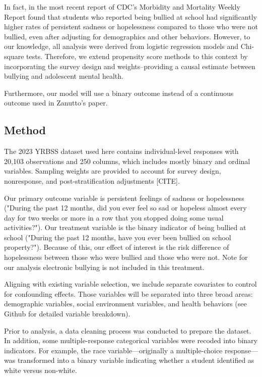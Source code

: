 \documentclass[12pt]{article}
\begin{document}
In fact, in the most recent report of CDC's Morbidity and Mortality Weekly Report found that students who reported being bullied at school had significantly higher rates of persistent sadness or hopelessness compared to those who were not bullied, even after adjusting for demographics and other behaviors. However, to our knowledge, all analysis were derived from logistic regression models and Chi-square tests. Therefore, we extend propensity score methods to this context by incorporating the survey design and weights--providing a causal estimate between bullying and adolescent mental health.

Furthermore, our model will use a binary outcome instead of a continuous outcome used in Zanutto's paper.

\subsection{Method}

The 2023 YRBSS dataset used here contains individual-level responses with 20,103 observations and 250 columns, which includes mostly binary and ordinal variables. Sampling weights are provided to account for survey design, nonresponse, and post-stratification adjustments [CITE].

Our primary outcome variable is persistent feelings of sadness or hopelessness ("During the past 12 months, did you ever feel so sad or hopeless almost every day for two weeks or more in a row that you stopped doing some usual activities?"). Our treatment variable is the binary indicator of being bullied at school ("During the past 12 months, have you ever been bullied on school property?"). Because of this, our effect of interest is the risk difference of hopelessness between those who were bullied and those who were not. Note for our analysis electronic bullying is not included in this treatment.

Aligning with existing variable selection, we include separate covariates to control for confounding effects. Those variables will be separated into three broad areas: demographic variables, social environment variables, and health behaviors (see Github for detailed variable breakdown).

Prior to analysis, a data cleaning process was conducted to prepare the dataset. In addition, some multiple-response categorical variables were recoded into binary indicators. For example, the race variable—originally a multiple-choice response—was transformed into a binary variable indicating whether a student identified as white versus non-white.
\end{document}
